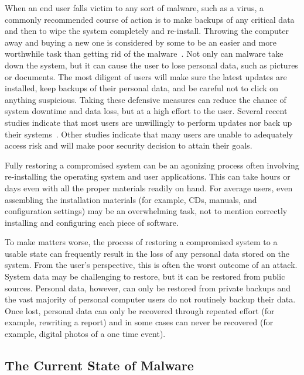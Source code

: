 When an end user falls victim to any sort of malware, such as a virus, a commonly recommended course of action is to make backups of any critical data and then to wipe the system completely and re-install. Throwing the computer away and buying a new one is considered by some to be an easier and more worthwhile task than getting rid of the malware~\cite{NewYork_Times_2005, KOMU-TV_2010}. Not only can malware take down the system, but it can cause the user to lose personal data, such as pictures or documents. The most diligent of users will make sure the latest updates are installed, keep backups of their personal data, and be careful not to click on anything suspicious. Taking these defensive measures can reduce the chance of system downtime and data loss, but at a high effort to the user. Several recent studies indicate that most users are unwillingly to perform updates nor back up their systems~\cite{ Acronis_2009, The_Register_2009, Microsoft_TechNet_2010}. Other studies indicate that many users are unable to adequately access risk and will make poor security decision to attain their goals\cite{sunshine_wolf_2009, motiee_chi_2010}.

Fully restoring a compromised system can be an agonizing process often involving re-installing the operating system and user applications. This can take hours or days even with all the proper materials readily on hand. For average users, even assembling the installation materials (for example, CDs, manuals, and configuration settings) may be an overwhelming task, not to mention correctly installing and configuring each piece of software.
 
To make matters worse, the process of restoring a compromised system to a usable state can frequently result in the loss of any personal data stored on the system. From the user’s perspective, this is often the worst outcome of an attack. System data may be challenging to restore, but it can be restored from public sources. Personal data, however, can only be restored from private backups and the vast majority of personal computer users do not routinely backup their data. Once lost, personal data can only be recovered through repeated effort (for example, rewriting a report) and in some cases can never be recovered (for example, digital photos of a one time event).

\subsection{The Current State of Malware}

